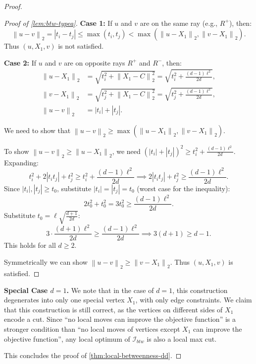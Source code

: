 \documentclass{article}
\theoremstyle{definition}  %
\theoremstyle{plain}
\newtheorem{remark}{Remark}
\numberwithin{observation}{section}
\numberwithin{claim}{section}
\numberwithin{fact}{section}
\numberwithin{lemma}{section}
\numberwithin{proposition}{section}
\numberwithin{theorem}{section}
\numberwithin{corollary}{section}
\numberwithin{definition}{section}
\newcommand{\calI}{\ensuremath{\mathcal{I}}}
\newcommand{\norm}[1]{\left\| #1 \right\|}
\theoremstyle{plain}
\begin{document}
\begin{proof}
\begin{proof}[Proof of \cref{lem:btw-typea}]
\textbf{Case 1:} If $u$ and $v$ are on the same ray (e.g., $R^+$), then:
\[
\norm{u - v}_2 = |t_i - t_j| \leq \max(t_i, t_j) < \max(\norm{u - X_1}_2, \norm{v - X_1}_2).
\]
Thus $(u, X_1, v)$ is not satisfied.

\textbf{Case 2:} If $u$ and $v$ are on opposite rays $R^+$ and $R^-$, then:
\begin{align*}
  \norm{u - X_1}_2 &= \sqrt{t_i^2 + \norm{X_1 - C}_2^2} = \sqrt{t_i^2 + \frac{(d-1)\ell^2}{2d}}, \\
  \norm{v - X_1}_2 &= \sqrt{t_j^2 + \norm{X_1 - C}_2^2} = \sqrt{t_j^2 + \frac{(d-1)\ell^2}{2d}}, \\
  \norm{u - v}_2 &= |t_i| + |t_j|.
\end{align*}

We need to show that $\norm{u - v}_2 \geq \max(\norm{u - X_1}_2, \norm{v - X_1}_2)$.

To show $\norm{u - v}_2 \geq \norm{u - X_1}_2$, we need $(|t_i| + |t_j|)^2 \geq t_i^2 + \frac{(d-1)\ell^2}{2d}$.  
Expanding:
\[
t_i^2 + 2 |t_i t_j| + t_j^2 \geq t_i^2 + \frac{(d-1)\ell^2}{2d} \implies 2 |t_i t_j| + t_j^2 \geq \frac{(d-1)\ell^2}{2d}.
\]
Since $|t_i|, |t_j| \geq t_0$, substitute $|t_i| = |t_j| = t_0$ (worst case for the inequality):
\[
2t_0^2 + t_0^2 = 3t_0^2 \geq \frac{(d-1)\ell^2}{2d}.
\]
Substitute $t_0 = \ell \sqrt{\frac{d+1}{2d}}$:
\[
3 \cdot \frac{(d+1)\ell^2}{2d} \geq \frac{(d-1)\ell^2}{2d} \implies 3(d+1) \geq d-1.
\]
This holds for all $d \geq 2$.

Symmetrically we can show $\norm{u - v}_2 \geq \norm{v - X_1}_2$. Thus $(u, X_1, v)$ is satisfied.
\end{proof}

\textbf{Special Case $d=1$.} We note that in the case of $d=1$, this construction degenerates into only one special vertex $X_1$, with only edge constraints. We claim that this construction is still correct, as the vertices on different sides of $X_1$ encode a cut. Since ``no local moves can improve the objective function'' is a stronger condition than ``no local moves of vertices except $X_1$ can improve the objective function'', any local optimum of $\calI_{btw}$ is also a local max cut.

This concludes the proof of \cref{thm:local-betweenness-dd}.
\end{proof}

\end{document}
